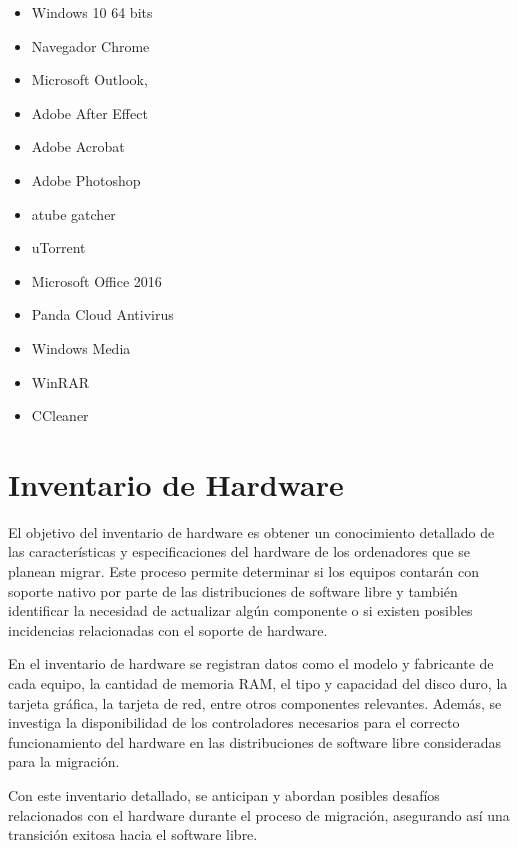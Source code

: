 			\begin{itemize}
				
				\item Windows 10 64 bits
				\item Navegador Chrome
				\item Microsoft Outlook,
				\item Adobe After Effect
				\item Adobe Acrobat
				\item Adobe Photoshop
				\item atube gatcher
				\item uTorrent
				\item Microsoft Office 2016
				\item Panda Cloud Antivirus
				\item Windows Media
				\item WinRAR
				\item CCleaner
			
			\end{itemize}
		
			\vspace{0.3cm}
		
	\section{Inventario de Hardware}
			
		El objetivo del inventario de hardware es obtener un conocimiento detallado de las características y especificaciones del hardware de los ordenadores que se planean migrar. Este proceso permite determinar si los equipos contarán con soporte nativo por parte de las distribuciones de software libre y también identificar la necesidad de actualizar algún componente o si existen posibles incidencias relacionadas con el soporte de hardware.\par
		
		En el inventario de hardware se registran datos como el modelo y fabricante de cada equipo, la cantidad de memoria RAM, el tipo y capacidad del disco duro, la tarjeta gráfica, la tarjeta de red, entre otros componentes relevantes. Además, se investiga la disponibilidad de los controladores necesarios para el correcto funcionamiento del hardware en las distribuciones de software libre consideradas para la migración.\par
		
		Con este inventario detallado, se anticipan y abordan posibles desafíos relacionados con el hardware durante el proceso de migración, asegurando así una transición exitosa hacia el software libre.\par
		
